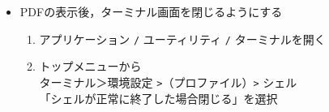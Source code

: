 \documentclass{ujarticle}
\begin{document}
\begin{enumerate}[\bf\large 1.]
\begin{itemize}
%
    \item PDFの表示後，ターミナル画面を閉じるようにする
       \begin{enumerate}[(1)]
        \item アプリケーション \verb|/| ユーティリティ \verb|/| ターミナルを開く
        \item トップメニューから\\
          \hspace*{5mm}ターミナル＞環境設定 \verb|>|（プロファイル）\verb|>| シェル\\
          \hspace*{10mm}「シェルが正常に終了した場合閉じる」を選択
        \end{enumerate}
\end{itemize}

\end{enumerate}
\end{document}

